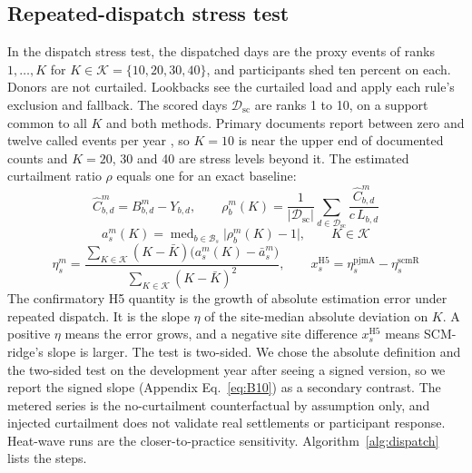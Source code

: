 \subsection{Repeated-dispatch stress test}\label{sec:methods:dispatch}

In the dispatch stress test, the dispatched days are the proxy events of ranks $1,\dots,K$ for $K\in\mathcal{K}=\{10,20,30,40\}$, and participants shed ten percent on each. Donors are not curtailed. Lookbacks see the curtailed load and apply each rule's exclusion and fallback. The scored days $\mathcal{D}_{\mathrm{sc}}$ are ranks 1 to 10, on a support common to all $K$ and both methods. Primary documents report between zero and twelve called events per year \cite{kiliccote2010,nyiso2024dr}, so $K=10$ is near the upper end of documented counts and $K=20$, 30 and 40 are stress levels beyond it. The estimated curtailment ratio $\rho$ equals one for an exact baseline:
\begin{equation}\label{eq:rho}
\hat{C}^{m}_{b,d}=B^{m}_{b,d}-Y_{b,d},\qquad \rho^{m}_{b}(K)=\frac{1}{\lvert\mathcal{D}_{\mathrm{sc}}\rvert}\sum_{d\in\mathcal{D}_{\mathrm{sc}}}\frac{\hat{C}^{m}_{b,d}}{c\,L_{b,d}}
\end{equation}
\begin{equation}\label{eq:abserr}
a^{m}_{s}(K)=\operatorname{med}_{b\in\mathcal{B}_{s}}\bigl\lvert\rho^{m}_{b}(K)-1\bigr\rvert,\qquad K\in\mathcal{K}
\end{equation}
\begin{equation}\label{eq:eta}
\eta^{m}_{s}=\frac{\sum_{K\in\mathcal{K}}(K-\bar{K})\bigl(a^{m}_{s}(K)-\bar{a}^{m}_{s}\bigr)}{\sum_{K\in\mathcal{K}}(K-\bar{K})^{2}},\qquad x^{\mathrm{H5}}_{s}=\eta^{\mathrm{pjmA}}_{s}-\eta^{\mathrm{scmR}}_{s}
\end{equation}
The confirmatory H5 quantity is the growth of absolute estimation error under repeated dispatch. It is the slope $\eta$ of the site-median absolute deviation on $K$. A positive $\eta$ means the error grows, and a negative site difference $x^{\mathrm{H5}}_s$ means SCM-ridge's slope is larger. The test is two-sided. We chose the absolute definition and the two-sided test on the development year after seeing a signed version, so we report the signed slope (Appendix Eq.~\eqref{eq:B10}) as a secondary contrast. The metered series is the no-curtailment counterfactual by assumption only, and injected curtailment does not validate real settlements or participant response. Heat-wave runs are the closer-to-practice sensitivity. Algorithm~\ref{alg:dispatch} lists the steps.

